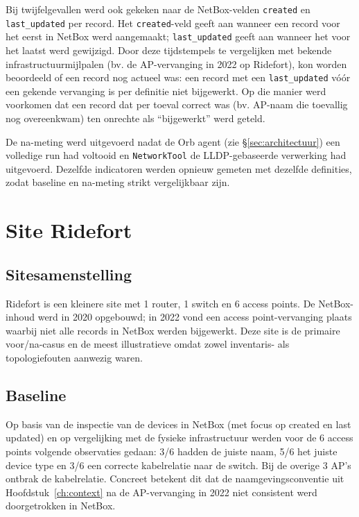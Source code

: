 Bij twijfelgevallen werd ook gekeken naar de NetBox-velden \texttt{created} en \texttt{last\_updated} per record. Het \texttt{created}-veld geeft aan wanneer een record voor het eerst in NetBox werd aangemaakt; \texttt{last\_updated} geeft aan wanneer het voor het laatst werd gewijzigd. Door deze tijdstempels te vergelijken met bekende infrastructuurmijlpalen (bv. de AP-vervanging in 2022 op Ridefort), kon worden beoordeeld of een record nog actueel was: een record met een \texttt{last\_updated} vóór een gekende vervanging is per definitie niet bijgewerkt. Op die manier werd voorkomen dat een record dat per toeval correct was (bv. AP-naam die toevallig nog overeenkwam) ten onrechte als ``bijgewerkt'' werd geteld.

De na-meting werd uitgevoerd nadat de Orb agent (zie \S\ref{sec:architectuur}) een volledige run had voltooid en \texttt{NetworkTool} de LLDP-gebaseerde verwerking had uitgevoerd. Dezelfde indicatoren werden opnieuw gemeten met dezelfde definities, zodat baseline en na-meting strikt vergelijkbaar zijn.

\section{Site Ridefort}
\label{sec:ridefort}

\subsection{Site\-samen\-stelling}

Ridefort is een kleinere site met 1 router, 1 switch en 6 access points. De NetBox-inhoud werd in 2020 opgebouwd; in 2022 vond een access point-vervanging plaats waarbij niet alle records in NetBox werden bijgewerkt. Deze site is de primaire voor/na-casus en de meest illustratieve omdat zowel inventaris- als topologiefouten aanwezig waren.

\subsection{Baseline}

Op basis van de inspectie van de devices in NetBox (met focus op created en last updated) en op vergelijking met de fysieke infrastructuur werden voor de 6 access points volgende observaties gedaan: 3/6 hadden de juiste naam, 5/6 het juiste device type en 3/6 een correcte kabelrelatie naar de switch. Bij de overige 3 AP's ontbrak de kabelrelatie. Concreet betekent dit dat de naamgevingsconventie uit Hoofdstuk~\ref{ch:context} na de AP-vervanging in 2022 niet consistent werd doorgetrokken in NetBox.

